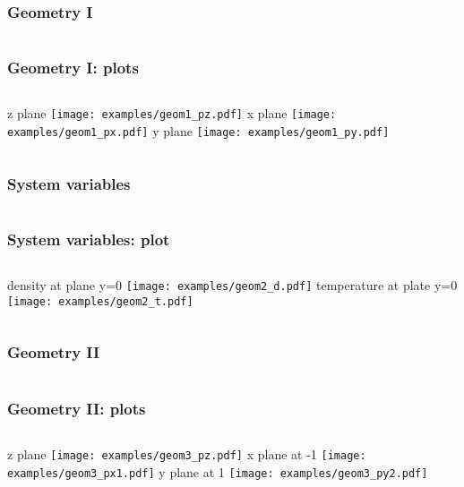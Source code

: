 \begin{frame}[fragile]
    \frametitle{Geometry I}
    \inputminted[frame=single,fontfamily=tt,fontsize=\footnotesize]{python}{examples/geom1.py}
\end{frame}

\begin{frame}\frametitle{Geometry I: plots}
    \begin{columns}
            {\tiny z plane}
            \texttt{[image: examples/geom1\_pz.pdf]}
            {\tiny x plane}
            \texttt{[image: examples/geom1\_px.pdf]}
            {\tiny y plane}
            \texttt{[image: examples/geom1\_py.pdf]}
    \end{columns}
\end{frame}

\begin{frame}[fragile]
    \frametitle{System variables}
    \inputminted[frame=single,fontfamily=tt,fontsize=\scriptsize]{python}{examples/geom2.py}
\end{frame}

\begin{frame}\frametitle{System variables: plot}
    \begin{columns}
        {\tiny density at plane y=0}
        \texttt{[image: examples/geom2\_d.pdf]}
        {\tiny temperature at plate y=0}
        \texttt{[image: examples/geom2\_t.pdf]}
    \end{columns}
\end{frame}

\begin{frame}[fragile]
    \frametitle{Geometry II}
    \inputminted[frame=single,fontfamily=tt,fontsize=\footnotesize]{python}{examples/geom3.py}
\end{frame}

\begin{frame}\frametitle{Geometry II: plots}
    \begin{columns}
            {\tiny z plane}
            \texttt{[image: examples/geom3\_pz.pdf]}
            {\tiny x plane at -1}
            \texttt{[image: examples/geom3\_px1.pdf]}
            {\tiny y plane at 1}
            \texttt{[image: examples/geom3\_py2.pdf]}
    \end{columns}
\end{frame}


